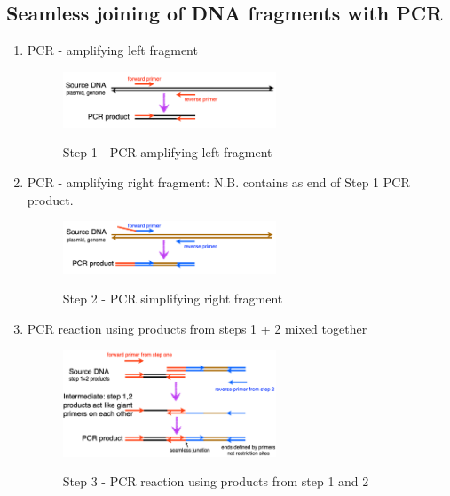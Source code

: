 \subsection{Seamless joining of DNA fragments with PCR}
\begin{enumerate}
    \item PCR - amplifying left fragment
    \begin{figure}[h]
    \centering
    \includegraphics[width=0.6\textwidth]{images/4-3-1.png}\\[.2in]
    \caption{Step 1 - PCR amplifying left fragment}
    \end{figure}
    \item PCR - amplifying right fragment: N.B.  contains  as end of Step 1 PCR product.
    \begin{figure}[h]
    \centering
    \includegraphics[width=0.6\textwidth]{images/4-3-2.png}\\[.2in]
    \caption{Step 2 - PCR simplifying right fragment}
    \end{figure}
    \item PCR reaction using products from steps 1 + 2 mixed together
    \begin{figure}[h]
    \centering
    \includegraphics[width=0.6\textwidth]{images/4-3-3.png}\\[.2in]
    \caption{Step 3 - PCR reaction using products from step 1 and 2}
    \end{figure}
\end{enumerate}
